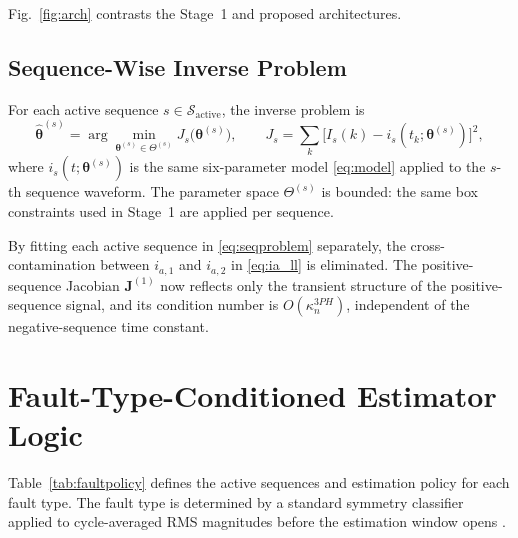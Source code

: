 \documentclass[10pt,journal,twoside]{IEEEtran}
\begin{document}
Fig.~\ref{fig:arch} contrasts the Stage~1 and proposed architectures.

\subsection{Sequence-Wise Inverse Problem}
\label{sec:formulation:seqproblem}

For each active sequence $s \in \mathcal{S}_{\mathrm{active}}$, the
inverse problem is
\begin{equation}
\hat{\bm{\theta}}^{(s)} = \arg\min_{\bm{\theta}^{(s)} \in \Theta^{(s)}}
  J_s\bigl(\bm{\theta}^{(s)}\bigr),
  \qquad
  J_s = \sum_k \bigl[I_s(k) - i_s(t_k;\bm{\theta}^{(s)})\bigr]^2,
\label{eq:seqproblem}
\end{equation}
where $i_s(t;\bm{\theta}^{(s)})$ is the same six-parameter model
\eqref{eq:model} applied to the $s$-th sequence waveform.
The parameter space $\Theta^{(s)}$ is bounded: the same box constraints
used in Stage~1 are applied per sequence.

By fitting each active sequence in \eqref{eq:seqproblem} separately, the
cross-contamination between $i_{a,1}$ and $i_{a,2}$ in \eqref{eq:ia_ll}
is eliminated.  The positive-sequence Jacobian $\mathbf{J}^{(1)}$ now
reflects only the transient structure of the positive-sequence signal,
and its condition number is $O(\kappa_n^{3PH})$, independent of the
negative-sequence time constant.

\section{Fault-Type-Conditioned Estimator Logic}
\label{sec:conditioned}

Table~\ref{tab:faultpolicy} defines the active sequences and estimation
policy for each fault type.  The fault type is determined by a standard
symmetry classifier applied to cycle-averaged RMS magnitudes before the
estimation window opens \cite{Kimbark1956}.
\end{document}
